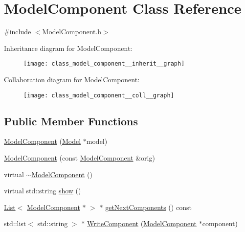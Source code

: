 \hypertarget{class_model_component}{\section{Model\-Component Class Reference}
\label{class_model_component}
}


{\ttfamily \#include $<$Model\-Component.\-h$>$}



Inheritance diagram for Model\-Component\-:\nopagebreak
\begin{figure}[H]
\begin{center}
\leavevmode
\texttt{[image: class\_model\_component\_\_inherit\_\_graph]}
\end{center}
\end{figure}


Collaboration diagram for Model\-Component\-:\nopagebreak
\begin{figure}[H]
\begin{center}
\leavevmode
\texttt{[image: class\_model\_component\_\_coll\_\_graph]}
\end{center}
\end{figure}
\subsection*{Public Member Functions}
\begin{DoxyCompactItemize}
\item 
\hyperlink{class_model_component_a1e2b24c3592711a9bd3f131706b7f0c7}{Model\-Component} (\hyperlink{class_model}{Model} $\ast$model)
\item 
\hyperlink{class_model_component_a5b95933e7a265039eb01f6ec88d92675}{Model\-Component} (const \hyperlink{class_model_component}{Model\-Component} \&orig)
\item 
virtual \hyperlink{class_model_component_a6d490d6a2fdf66ad13ed8adcc39ec611}{$\sim$\-Model\-Component} ()
\item 
virtual std\-::string \hyperlink{class_model_component_ad8bc846e36b028eab7efb7da6c549eca}{show} ()
\item 
\hyperlink{class_list}{List}$<$ \hyperlink{class_model_component}{Model\-Component} $\ast$ $>$ $\ast$ \hyperlink{class_model_component_a89fe8e3fb064c68aebbecd36eeed7d43}{get\-Next\-Components} () const 
\item 
std\-::list$<$ std\-::string $>$ $\ast$ \hyperlink{class_model_component_a3bdf3706c49706e674ab13fd9d1d83ed}{Write\-Component} (\hyperlink{class_model_component}{Model\-Component} $\ast$component)
\end{DoxyCompactItemize}
